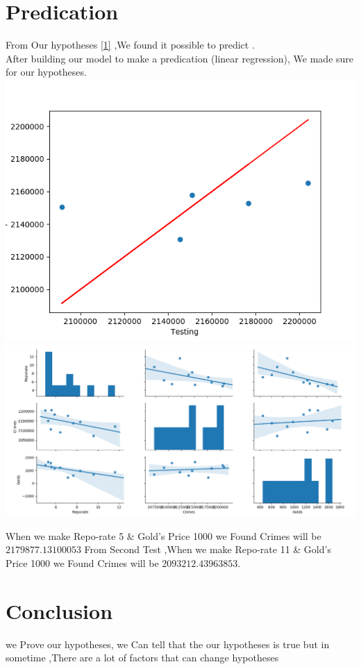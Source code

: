 \documentclass[landscape,17pt]{extarticle}
\begin{document}
\section{Predication}
From Our hypotheses \hypertarget{[1]}{\hyperlink{hypotheses}{[1]}} ,We found it possible to predict .\\
After building our model to make a predication (linear regression), We made sure for our hypotheses.\\
\includegraphics[width=.5\textwidth,height=.4\textheight]{Images/B.png}
\includegraphics[width=.5\textwidth,height=.4\textheight]{Images/C.png}

When we make Repo-rate 5 \& Gold's Price 1000 we Found Crimes will be $2179877.13100053$
From Second Test ,When we make Repo-rate 11 \& Gold's Price 1000 we Found Crimes will be $2093212.43963853$.
\newpage
\section{Conclusion}
we Prove our hypotheses, we Can tell that the our hypotheses is true but in sometime ,There are a lot of factors that can change hypotheses
\newpage


\end{document}
